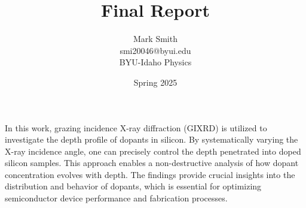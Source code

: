 \documentclass{article}
\title{Final Report}
\author{Mark Smith \vspace{1.5mm} \\ smi20046@byui.edu \vspace{1.5mm} \\ BYU-Idaho Physics}
\date{Spring 2025}
\begin{document}
\maketitle


\section*{}
    
    In this work, grazing incidence X-ray diffraction (GIXRD) is utilized to investigate the depth profile of dopants in silicon. 
    By systematically varying the X-ray incidence angle, one can precisely control the depth penetrated into doped silicon samples. 
    This approach enables a non-destructive analysis of how dopant concentration evolves with depth. 
    The findings provide crucial insights into the distribution and behavior of dopants, which is essential for optimizing semiconductor device performance and fabrication processes.


\end{document}
